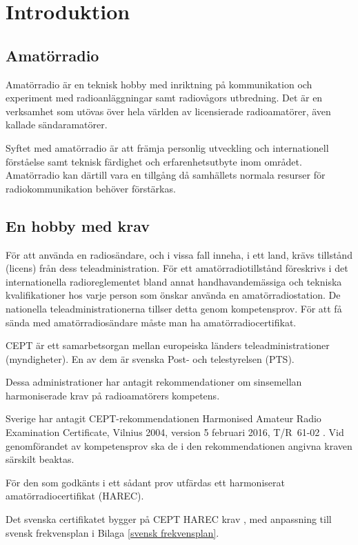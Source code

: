 
\chapter*{Introduktion}

\section*{Amatörradio}

Amatörradio är en teknisk hobby med inriktning på kommunikation och experiment
med radioanläggningar samt radiovågors utbredning. Det är en verksamhet som
utövas över hela världen av licensierade radioamatörer, även kallade
sändaramatörer.

Syftet med amatörradio är att främja personlig utveckling och internationell
förståelse samt teknisk färdighet och erfarenhetsutbyte inom området.
Amatörradio kan därtill vara en tillgång då samhällets normala resurser för
radiokommunikation behöver förstärkas.

\section*{En hobby med krav}

För att använda en radiosändare, och i vissa fall inneha, i ett land, krävs
tillstånd (licens) från dess teleadministration.
För ett amatörradiotillstånd föreskrivs i det internationella radioreglementet
\cite{ITU-RR} bland annat handhavandemässiga och tekniska kvalifikationer hos
varje person som önskar använda en amatörradiostation.
De nationella teleadministrationerna tillser detta genom kompetensprov.
För att få sända med amatörradiosändare måste man ha amatörradiocertifikat.

CEPT är ett samarbetsorgan mellan europeiska länders teleadministrationer
(myndigheter).
En av dem är svenska Post- och telestyrelsen (PTS).

Dessa administrationer har antagit rekommendationer om sinsemellan
harmoniserade krav på radioamatörers kompetens.

Sverige har antagit CEPT-rekom\-men\-da\-ti\-on\-en
 Ha\-rmonised Amateur Radio Examination
Certificate, Vilnius 2004, version 5 februari 2016, T/R~61-02 \cite{TR6102}.
Vid genomförandet av kompetensprov ska de i den rekommendationen
angivna kraven särskilt beaktas.

För den som godkänts i ett sådant prov utfärdas ett harmoniserat
amatörradiocertifikat (HAREC).

Det svenska certifikatet bygger på CEPT HAREC krav \cite{TR6102},
med anpassning till svensk frekvensplan i Bilaga \ref{svensk frekvensplan}.

